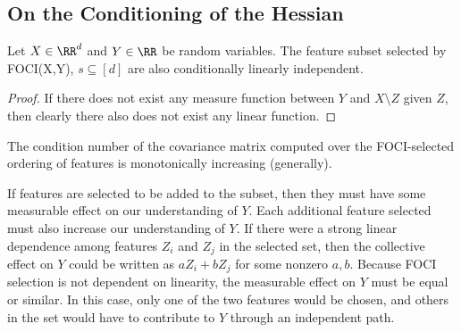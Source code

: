
\subsection{On the Conditioning of the Hessian}
\begin{proposition}
Let $X \in \RR^d$ and $Y \in \RR$ be random variables. The feature subset selected by FOCI(X,Y), $s \subseteq [d]$ are also conditionally linearly independent.
\end{proposition}
\begin{proof}
If there does not exist any measure function between $Y$ and $X\setminus Z$ given $Z$, then clearly there also does not exist any linear function.

\end{proof}
\begin{proposition}
The condition number of the covariance matrix computed over the FOCI-selected ordering of features is monotonically increasing (generally).
\end{proposition}
If features are selected to be added to the subset, then they must have some measurable effect on our understanding of $Y$. Each additional feature selected must also increase our understanding of $Y$. If there were a strong linear dependence among features $Z_i$ and $Z_j$ in the selected set, then the collective effect on $Y$ could be written as $a Z_i + b Z_j$ for some nonzero $a,b$. Because FOCI selection is not dependent on linearity, the measurable effect on $Y$ must be equal or similar. In this case, only one of the two features would be chosen, and others in the set would have to contribute to $Y$ through an independent path.

